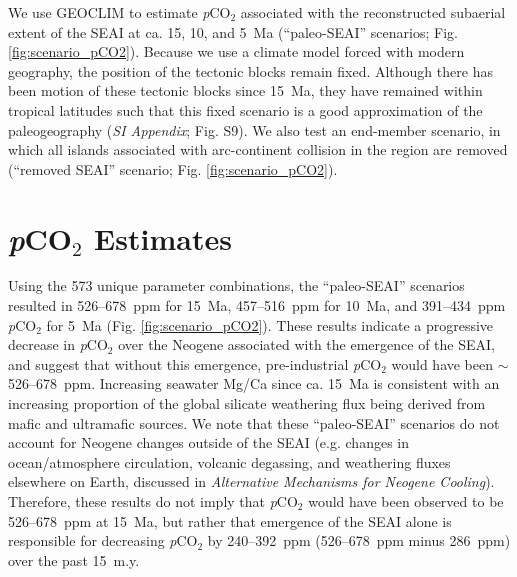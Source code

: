 \documentclass[9pt,twocolumn,twoside,lineno]{pnas-new}
\newcommand{\pCOtwo}{\textit{p}CO$_{2}$\xspace}
\newcommand{\SI}{\textit{SI Appendix}\xspace}
\begin{document}
We use GEOCLIM to estimate \pCOtwo associated with the reconstructed subaerial extent of the SEAI at ca. 15, 10, and 5~Ma (``paleo-SEAI'' scenarios; Fig. \ref{fig:scenario_pCO2}). Because we use a climate model forced with modern geography, the position of the tectonic blocks remain fixed. Although there has been motion of these tectonic blocks since 15~Ma, they have remained within tropical latitudes such that this fixed scenario is a good approximation of the paleogeography (\SI; Fig. S9). We also test an end-member scenario, in which all islands associated with arc-continent collision in the region are removed (``removed SEAI'' scenario; Fig. \ref{fig:scenario_pCO2}).

\section*{\pCOtwo Estimates}

Using the 573 unique parameter combinations, the ``paleo-SEAI'' scenarios resulted in 526--678~ppm for 15~Ma, 457--516~ppm for 10~Ma, and 391--434~ppm \pCOtwo for 5~Ma (Fig. \ref{fig:scenario_pCO2}). These results indicate a progressive decrease in \pCOtwo over the Neogene associated with the emergence of the SEAI, and suggest that without this emergence, pre-industrial \pCOtwo would have been $\sim$526--678~ppm. Increasing seawater Mg/Ca since ca. 15~Ma \cite{Higgins2012a} is consistent with an increasing proportion of the global silicate weathering flux being derived from mafic and ultramafic sources. We note that these ``paleo-SEAI'' scenarios do not account for Neogene changes outside of the SEAI (e.g. changes in ocean/atmosphere circulation, volcanic degassing, and weathering fluxes elsewhere on Earth, discussed in \textit{Alternative Mechanisms for Neogene Cooling}). Therefore, these results do not imply that \pCOtwo would have been observed to be 526--678~ppm at 15~Ma, but rather that emergence of the SEAI alone is responsible for decreasing \pCOtwo by 240--392~ppm (526--678~ppm minus 286~ppm) over the past 15~m.y.
\end{document}

